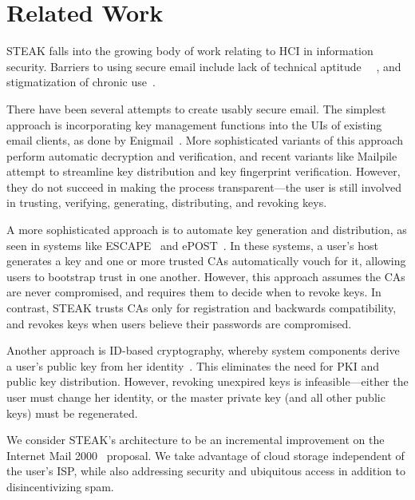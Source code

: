 \section{Related Work}
\label{sec:related-work}

STEAK falls into the growing body of work relating to HCI in information security.  Barriers
to using secure email include lack of technical aptitude~\cite{why-jonny-cant-encrypt}
~\cite{garfinkel-email-survey}, and
stigmatization of chronic use~\cite{crypto-adoption-criteria}.

There have been several attempts to create usably secure email.
The simplest approach is incorporating key management functions into the 
UIs of existing email clients, as done by Enigmail~\cite{enigmail}.
More sophisticated variants of this approach perform automatic decryption
and verification, and recent variants like Mailpile~\cite{mailpile} attempt
to streamline key distribution and key fingerprint verification.  However, they do not
succeed in making the process transparent---the user is still involved in
trusting, verifying, generating, distributing, and revoking keys.

A more sophisticated approach is to automate key generation and distribution,
as seen in systems like ESCAPE~\cite{escape} and ePOST~\cite{epost}.
In these systems, a user's host generates a key and one or more trusted CAs
automatically vouch for it, allowing users to bootstrap trust in one another.
However, this approach assumes the CAs are never compromised, and requires them
to decide when to revoke keys.
In contrast, STEAK trusts CAs only for registration and backwards
compatibility, and revokes keys when users believe 
their passwords are compromised.

Another approach is ID-based cryptography, whereby system components
derive a user's public key from her identity~\cite{id-based-cryptography}.  This 
eliminates the need for PKI and public key distribution.  However,
revoking unexpired keys is infeasible---either the user must change 
her identity, or the master private key (and all other public keys) must be 
regenerated.

We consider STEAK's architecture to be an incremental improvement on
the Internet Mail 2000~\cite{im2k} proposal.  We take advantage of cloud storage 
independent of the user's ISP, while also addressing security and ubiquitous
access in addition to disincentivizing spam.
